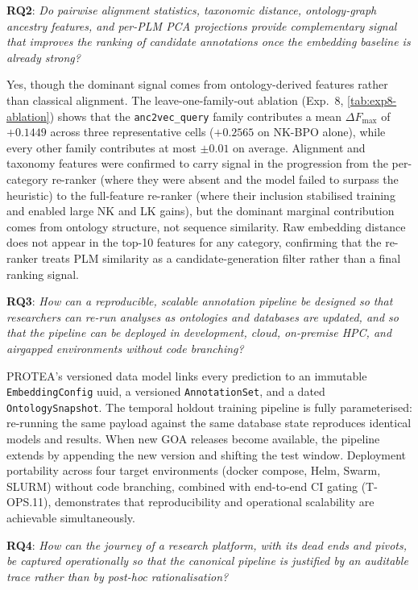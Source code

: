 \textbf{RQ2}: \emph{Do pairwise alignment statistics, taxonomic distance,
ontology-graph ancestry features, and per-PLM PCA projections provide
complementary signal that improves the ranking of candidate annotations once
the embedding baseline is already strong?}

Yes, though the dominant signal comes from ontology-derived features rather
than classical alignment. The leave-one-family-out ablation (Exp.~8,
\cref{tab:exp8-ablation}) shows that the \texttt{anc2vec\_query} family
contributes a mean $\Delta F_{\max}$ of $+0.1449$ across three representative
cells ($+0.2565$ on NK-BPO alone), while every other family contributes at
most $\pm 0.01$ on average. Alignment and taxonomy features were confirmed to
carry signal in the progression from the per-category re-ranker (where they were
absent and the model failed to surpass the heuristic) to the full-feature
re-ranker (where their inclusion stabilised training and enabled large NK and LK
gains), but the
dominant marginal contribution comes from ontology structure, not sequence
similarity. Raw embedding distance does not appear in the top-10 features for
any category, confirming that the re-ranker treats PLM similarity as a
candidate-generation filter rather than a final ranking signal.

\textbf{RQ3}: \emph{How can a reproducible, scalable annotation pipeline be
designed so that researchers can re-run analyses as ontologies and databases
are updated, and so that the pipeline can be deployed in development, cloud,
on-premise HPC, and airgapped environments without code branching?}

\begin{sloppypar}
PROTEA's versioned data model links every prediction to an immutable
\texttt{EmbeddingConfig} \gls{uuid}, a versioned \texttt{AnnotationSet}, and a dated
\texttt{OntologySnapshot}. The temporal holdout training pipeline is fully
parameterised: re-running the same payload against the same database state
reproduces identical models and results. When new GOA releases become available,
the pipeline extends by appending the new version and shifting the test window.
Deployment portability across four target environments (docker compose, Helm,
Swarm, SLURM) without code branching, combined with end-to-end CI gating
(T-OPS.11), demonstrates that reproducibility and operational scalability are
achievable simultaneously.
\end{sloppypar}

\textbf{RQ4}: \emph{How can the journey of a research platform, with its dead
ends and pivots, be captured operationally so that the canonical pipeline is
justified by an auditable trace rather than by post-hoc rationalisation?}

